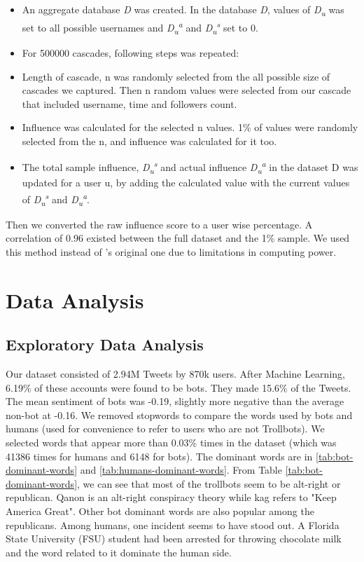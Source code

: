 \documentclass[letterpaper]{article}
\begin{document}
 \begin{itemize}
    \item An aggregate database \textit{D} was created. In the database \textit{D}, values of \textit{D\textsubscript{u}} was set to all possible usernames  and \textit{D\textsubscript{u}\textsuperscript{a}}
     and \textit{D\textsubscript{u}\textsuperscript{s}} set to 0.
    \item For 500000 cascades, following steps was repeated:
    \setlength{\itemindent}{+.3in}
    \item Length of cascade, n was randomly selected from the all possible size of cascades we captured. Then n random values were selected from our cascade that included 
    username, time and followers count.
    \item Influence was calculated for the selected n values. 1\% of values were randomly selected from the n, and influence was calculated for it too.
    \item The total sample influence, \textit{D\textsubscript{u}\textsuperscript{s}} and actual influence \textit{D\textsubscript{u}\textsuperscript{a}} in the dataset D was updated for a user u,
    by adding the calculated value with the current values of \textit{D\textsubscript{u}\textsuperscript{s}} and \textit{D\textsubscript{u}\textsuperscript{a}}.
 \end{itemize}

Then we converted the raw influence score to a user wise percentage. A correlation of 0.96 existed between the full dataset and the 1\% sample. We used this method 
 instead of \cite{rizoiu2018debatenight}'s original one due to limitations in computing power.


 \section{Data Analysis}
\label{sec:analysis}

\subsection{Exploratory Data Analysis}
Our dataset consisted of 2.94M Tweets by 870k users. After Machine Learning, 6.19\% of these accounts 
were found to be bots. They made 15.6\% of the Tweets. The mean 
sentiment of bots was -0.19, slightly more negative than the average non-bot at -0.16. We 
removed stopwords to compare the words used by bots and humans (used for convenience to refer to users who are not Trollbots). 
We selected words that appear more than 0.03\% times in the dataset (which was 41386 times for humans and 6148 for 
bots). The dominant words are in 
\ref{tab:bot-dominant-words} and \ref{tab:humans-dominant-words}. From Table \ref{tab:bot-dominant-words}, 
we can see that most of the trollbots seem to be alt-right or republican. Qanon is an alt-right conspiracy theory 
while kag refers to "Keep America Great". Other bot dominant words are also popular among the republicans.
Among humans, one incident seems to have stood out. A Florida State University (FSU) student had been 
arrested for throwing chocolate milk and the word related to it dominate the human side.
\end{document}
